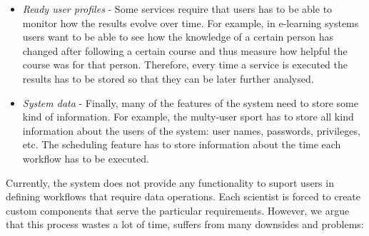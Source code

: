 \documentclass[a4paper, notitlepage]{article}
\begin{document}
\begin{itemize}
	\item \textit{Ready user profiles} - Some services require that users has to be able to monitor how the results evolve over time. For example, in e-learning systems users want to be able to see how the knowledge of a certain person has changed after following a certain course and thus measure how helpful the course was for that person. Therefore, every time a service is executed the results has to be stored so that they can be later further analysed.
	
	\item \textit{System data} - Finally, many of the features of the system need to store some kind of information. For example, the multy-user sport has to store all kind information about the users of the system: user names, passwords, privileges, etc. The scheduling feature has to store information about the time each workflow has to be executed. 
	
\end{itemize}

Currently, the system does not provide any functionality to suport users in defining workflows that require data operations. Each scientist is forced to create custom components that serve the particular requirements. However, we argue that this process wastes a lot of time, suffers from many downsides and problems:
\end{document}
